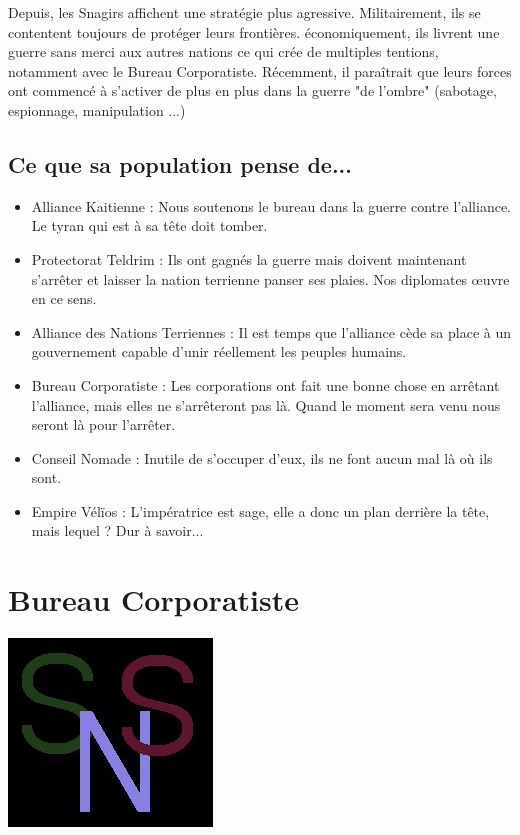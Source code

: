 \begin{multicols}{2}
Depuis, les Snagirs affichent une stratégie plus agressive. Militairement, ils se contentent toujours de protéger leurs frontières. économiquement, ils livrent une guerre sans merci aux autres nations ce qui crée de multiples tentions, notamment avec le Bureau Corporatiste. Récemment, il paraîtrait que leurs forces ont commencé à s'activer de plus en plus dans la guerre "de l'ombre" (sabotage, espionnage, manipulation ...)

\subsection{Ce que sa population pense de...}

\begin{itemize}
\item Alliance Kaitienne : Nous soutenons le bureau dans la guerre contre l'alliance. Le tyran qui est à sa tête doit tomber.
\item Protectorat Teldrim : Ils ont gagnés la guerre mais doivent maintenant s'arrêter et laisser la nation terrienne panser ses plaies. Nos diplomates œuvre en ce sens.
\item Alliance des Nations Terriennes : Il est temps que l'alliance cède sa place à un gouvernement capable d'unir réellement les peuples humains.
\item Bureau Corporatiste : Les corporations ont fait une bonne chose en arrêtant l'alliance, mais elles ne s'arrêteront pas là. Quand le moment sera venu nous seront là pour l'arrêter.
\item Conseil Nomade : Inutile de s'occuper d'eux, ils ne font aucun mal là où ils sont.
\item Empire Vélïos : L'impératrice est sage, elle a donc un plan derrière la tête, mais lequel ? Dur à savoir...
\end{itemize}

\section{Bureau Corporatiste}

\begin{center}
\includegraphics[scale=0.2]{Img/logo_corpo}
\end{center}


\end{multicols}
